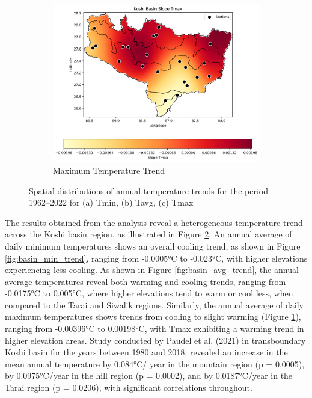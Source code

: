 \begin{figure}[htbp]
  \vspace{0.5cm} %
  
  \begin{subfigure}{0.45\textwidth}
      \centering
      \includegraphics[width=\linewidth]{images/avg_krig_Koshi Basin Slope Tmax.png}
      \caption{Maximum Temperature Trend}
      \label{fig:basin_max_trend}
  \end{subfigure}
  
  \caption{Spatial distributions of annual temperature trends for the period 1962–2022 for (a) Tmin, (b) Tavg, (c) Tmax}
  \label{fig:krig_results}
\end{figure}

The results obtained from the analysis reveal a heterogeneous temperature trend across the Koshi basin region, as illustrated in Figure \ref{fig:krig_results}. An annual average of daily minimum temperatures shows an overall cooling trend, as shown in Figure \ref{fig:basin_min_trend}, ranging from -0.0005°C to -0.023°C, with higher elevations experiencing less cooling. As shown in Figure \ref{fig:basin_avg_trend}, the annual average temperatures reveal both warming and cooling trends, ranging from -0.0175°C to 0.005°C, where higher elevations tend to warm or cool less, when compared to the Tarai and Siwalik regions. Similarly, the annual average of daily maximum temperatures shows trends from cooling to slight warming (Figure \ref{fig:basin_max_trend}), ranging from -0.00396°C to 0.00198°C, with Tmax exhibiting a warming trend in higher elevation areas. Study conducted by Paudel et al. (2021) in transboundary Koshi basin for the years between 1980 and 2018, revealed an increase in the mean annual temperature by 0.084°C/ year in the mountain region (p = 0.0005), by 0.0975°C/year in the hill region (p = 0.0002), and by 0.0187°C/year in the Tarai region (p = 0.0206), with significant correlations throughout. 

